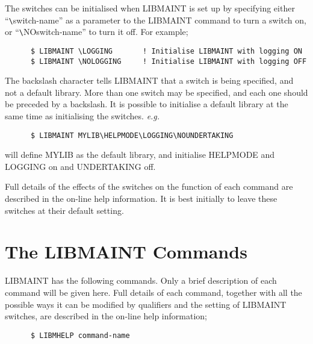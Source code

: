 The switches can be initialised when LIBMAINT is set up by specifying
either ``\verb+\+switch-name'' as a parameter to the LIBMAINT command to turn a
switch on, or ``\verb+\+NOswitch-name'' to turn it off.
For example;
\begin{verbatim}
      $ LIBMAINT \LOGGING       ! Initialise LIBMAINT with logging ON
      $ LIBMAINT \NOLOGGING     ! Initialise LIBMAINT with logging OFF
\end{verbatim}
The backslash character tells LIBMAINT that a switch is being specified,
and not a default library.
More than one switch may be specified, and each one should be
preceded by a backslash.
It is possible to initialise a default library at the same time
as initialising the switches. {\it e.g.}
\begin{verbatim}
      $ LIBMAINT MYLIB\HELPMODE\LOGGING\NOUNDERTAKING
\end{verbatim}
will define MYLIB as the default library, and initialise HELPMODE
and LOGGING on and UNDERTAKING off.

Full details of the effects of the switches on the function
of each command are described in the on-line help information.
It is best initially to leave these switches at their default
setting.

\section{The LIBMAINT Commands}

LIBMAINT has the following commands.
Only a brief description of each command will be given here.
Full details of each command, together with all the possible ways it can
be modified by qualifiers and the setting of LIBMAINT switches, are
described in the on-line help information;
\begin{verbatim}
      $ LIBMHELP command-name
\end{verbatim}


\settowidth{\numlen}{00000000}
\settowidth{\labelsep}{0000}

